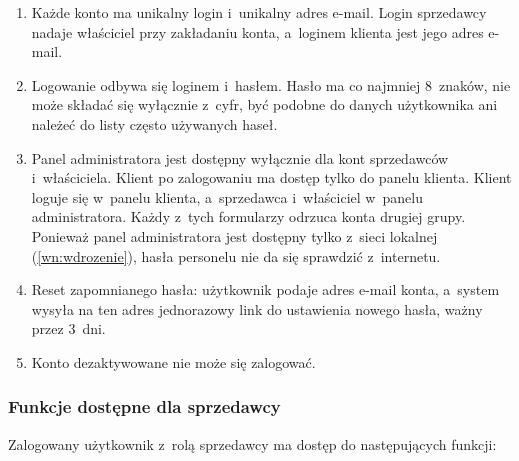 \documentclass[12pt,a4paper,oneside]{article}
\newcounter{pu}
\begin{document}
\begin{enumerate}[resume*=wf]
	\item \label{wf:login} Każde konto ma unikalny login i~unikalny adres e-mail. Login sprzedawcy nadaje właściciel przy zakładaniu konta, a~loginem klienta jest jego adres e-mail.
	\item \label{wf:logowanie} Logowanie odbywa się loginem i~hasłem. Hasło ma co najmniej 8~znaków, nie może składać się wyłącznie z~cyfr, być podobne do danych użytkownika ani należeć do listy często używanych haseł.
	\item \label{wf:panel-admina} Panel administratora jest dostępny wyłącznie dla kont sprzedawców i~właściciela. Klient po zalogowaniu ma dostęp tylko do panelu klienta. Klient loguje się w~panelu klienta, a~sprzedawca i~właściciel w~panelu administratora. Każdy z~tych formularzy odrzuca konta drugiej grupy. Ponieważ panel administratora jest dostępny tylko z~sieci lokalnej (\ref{wn:wdrozenie}), hasła personelu nie da się sprawdzić z~internetu.
	\item \label{wf:reset-hasla} Reset zapomnianego hasła: użytkownik podaje adres e-mail konta, a~system wysyła na ten adres jednorazowy link do ustawienia nowego hasła, ważny przez 3~dni.
	\item \label{wf:dezaktywowane} Konto dezaktywowane nie może się zalogować.
\end{enumerate}

\subsubsection{Funkcje dostępne dla sprzedawcy}

Zalogowany użytkownik z~rolą sprzedawcy ma dostęp do następujących funkcji:
\end{document}
